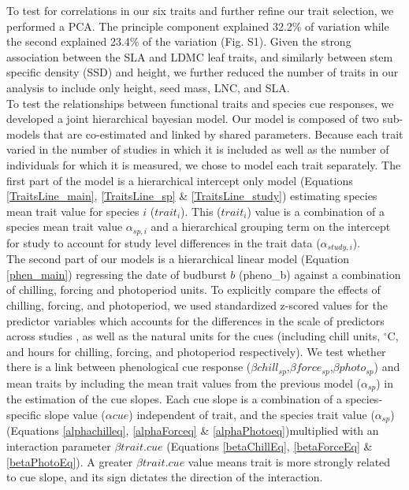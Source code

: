 \documentclass{article}\usepackage[]{graphicx}\usepackage[]{color}
\begin{document}
To test for correlations in our six traits and further refine our trait selection, we performed a PCA. The principle component explained 32.2\% of variation while the second explained 23.4\% of the variation (Fig. S1). Given the strong association between the SLA and LDMC leaf traits, and similarly between stem specific density (SSD) and height, we further reduced the number of traits in our analysis to include only height, seed mass, LNC, and SLA. \\

To test the relationships between functional traits and species cue responses, we developed a joint hierarchical bayesian model. Our model is composed of two sub-models that are co-estimated and linked by shared parameters. Because each trait varied in the number of studies in which it is included as well as the number of individuals for which it is measured, we chose to model each trait separately. The first part of the model is a hierarchical intercept only model (Equations \ref{TraitsLine_main}, \ref{TraitsLine_sp} & \ref{TraitsLine_study}) estimating species mean trait value for species $i$ ($trait_{i}$). This ($trait_{i}$) value is a combination of a species mean trait value $\alpha_{sp,i}$ and a hierarchical grouping term on the intercept for study to account for study level differences in the trait data ($\alpha_{study,i}$).  \\

The second part of our models is a hierarchical linear model (Equation \ref{phen_main}) regressing the date of budburst $b$ (pheno_{b}) against a combination of chilling, forcing and photoperiod units. To explicitly compare the effects of chilling, forcing, and photoperiod, we used standardized z-scored values for the predictor variables which accounts for the differences in the scale of predictors across studies \citep{Gelman2006}, as well as the natural units for the cues (including chill units, $^\circ$C, and hours for chilling, forcing, and photoperiod respectively). We test whether there is a link between phenological cue response ($\beta chill_{sp}$,$\beta force_{sp}$,$\beta photo_{sp}$) and mean traits by including the mean trait values from the previous model ($\alpha_{sp}$) in the estimation of the cue slopes. Each cue slope is a combination of a species-specific slope value ($\alpha cue$) independent of trait, and the species trait value ($\alpha_{sp}$) (Equations \ref{alphachilleq}, \ref{alphaForceq} & \ref{alphaPhotoeq})multiplied with an interaction parameter $\beta trait.cue$ (Equations \ref{betaChillEq}, \ref{betaForceEq} & \ref{betaPhotoEq}). A greater $\beta trait.cue$ value means trait is more strongly related to cue slope, and its sign dictates the direction of the interaction. 
\end{document}
